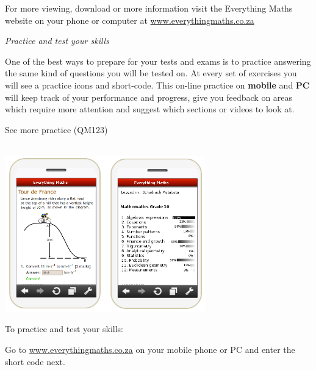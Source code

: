 \newpage
\thispagestyle{empty}
{\Large

For more viewing, download or more information visit the Everything Maths website on your phone or
computer at \underline{www.everythingmaths.co.za}  \par
\vspace*{1cm}
{\normalfont\sffamily\fontsize{22}\normalfont\itshape Practice and test your skills} \par


One of the best ways to prepare for your tests and exams is to practice answering the same kind of
questions you will be tested on. At every set of exercises you will see a practice icons and short-code.
This on-line practice on \textbf{mobile} and \textbf{PC} will keep track of your performance and progress, give you
feedback on areas which require more attention and suggest which sections or videos to look at.

\begin{center}
\caption{See more practice  (QM123)} \\
\includegraphics[width=0.65\textwidth]{title_images/practicephones.png}
\end{center}
\par



To practice and test your skills:\par

Go to \underline{www.everythingmaths.co.za} on your mobile phone or PC and enter the short code next.\par

\vspace*{1cm}


}
